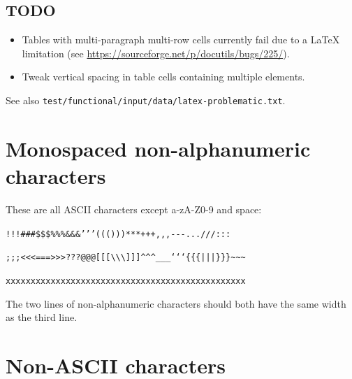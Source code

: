 \documentclass[a4paper]{article}
\begin{document}
\subsection{TODO%
  \label{todo}%
}

\begin{itemize}
\item Tables with multi-paragraph multi-row cells currently fail due to a
LaTeX limitation (see \url{https://sourceforge.net/p/docutils/bugs/225/}).

\item Tweak vertical spacing in table cells containing multiple elements.
\end{itemize}

See also \texttt{test/functional/input/data/latex-problematic.txt}.


\section{Monospaced non-alphanumeric characters%
  \label{monospaced-non-alphanumeric-characters}%
}

These are all ASCII characters except a-zA-Z0-9 and space:

\texttt{!!!\textquotedbl{}\textquotedbl{}\textquotedbl{}\#\#\#\$\$\$\%\%\%\&\&\&'{}'{}'((()))***+++,{},{},-{}-{}-...///:::}

\texttt{;;;<{}<{}<===>{}>{}>???@@@{[}{[}{[}\textbackslash{}\textbackslash{}\textbackslash{}{]}{]}{]}\textasciicircum{}\textasciicircum{}\textasciicircum{}\_\_\_`{}`{}`\{\{\{|||\}\}\}\textasciitilde{}\textasciitilde{}\textasciitilde{}}

\texttt{xxxxxxxxxxxxxxxxxxxxxxxxxxxxxxxxxxxxxxxxxxxxxxxx}

The two lines of non-alphanumeric characters should both have the same
width as the third line.


\section{Non-ASCII characters%
  \label{non-ascii-characters}%
}
\end{document}
